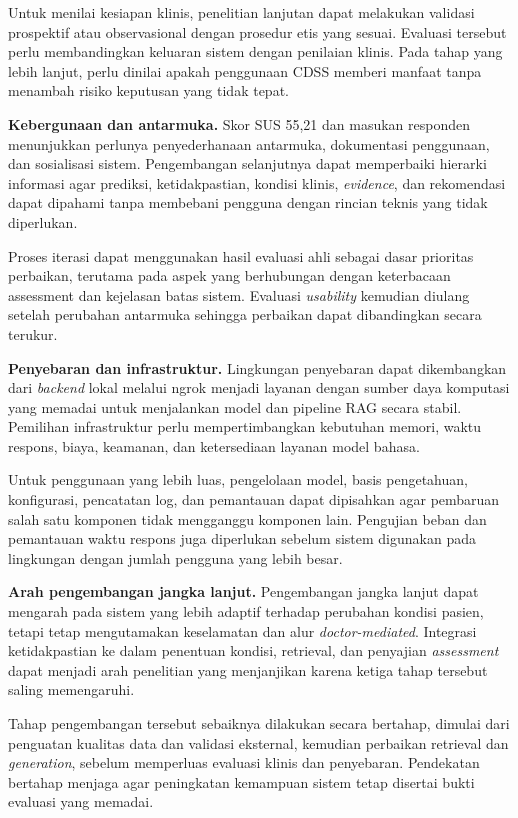Untuk menilai kesiapan klinis, penelitian lanjutan dapat melakukan validasi prospektif atau observasional dengan prosedur etis yang sesuai. Evaluasi
tersebut perlu membandingkan keluaran sistem dengan penilaian klinis. Pada tahap yang lebih lanjut, perlu dinilai apakah penggunaan CDSS memberi manfaat
tanpa menambah risiko keputusan yang tidak tepat.

\textbf{Kebergunaan dan antarmuka.} Skor SUS 55,21 dan masukan responden menunjukkan perlunya penyederhanaan antarmuka, dokumentasi penggunaan, dan sosialisasi sistem. Pengembangan
selanjutnya dapat memperbaiki hierarki informasi agar prediksi, ketidakpastian, kondisi klinis, \textit{evidence}, dan rekomendasi dapat dipahami tanpa
membebani pengguna dengan rincian teknis yang tidak diperlukan.

Proses iterasi dapat menggunakan hasil evaluasi ahli sebagai dasar prioritas perbaikan, terutama pada aspek yang berhubungan dengan keterbacaan
assessment dan kejelasan batas sistem. Evaluasi \textit{usability} kemudian diulang setelah perubahan antarmuka sehingga perbaikan dapat dibandingkan secara
terukur.

\textbf{Penyebaran dan infrastruktur.} Lingkungan penyebaran dapat dikembangkan dari \textit{backend} lokal melalui ngrok menjadi layanan dengan sumber
daya komputasi yang memadai untuk menjalankan model dan pipeline RAG secara stabil. Pemilihan infrastruktur perlu mempertimbangkan kebutuhan memori, waktu respons, biaya, keamanan,
dan ketersediaan layanan model bahasa.

Untuk penggunaan yang lebih luas, pengelolaan model, basis pengetahuan, konfigurasi, pencatatan log, dan pemantauan dapat dipisahkan agar pembaruan salah
satu komponen tidak mengganggu komponen lain. Pengujian beban dan pemantauan waktu respons juga diperlukan sebelum sistem digunakan pada lingkungan dengan
jumlah pengguna yang lebih besar.

\textbf{Arah pengembangan jangka lanjut.} Pengembangan jangka lanjut dapat mengarah pada sistem yang lebih adaptif terhadap perubahan kondisi pasien, tetapi tetap mengutamakan keselamatan
dan alur \textit{doctor-mediated}. Integrasi ketidakpastian ke dalam penentuan kondisi, retrieval, dan penyajian \textit{assessment} dapat menjadi arah
penelitian yang menjanjikan karena ketiga tahap tersebut saling memengaruhi.

Tahap pengembangan tersebut sebaiknya dilakukan secara bertahap, dimulai dari penguatan kualitas data dan validasi eksternal, kemudian perbaikan
retrieval dan \textit{generation}, sebelum memperluas evaluasi klinis dan penyebaran. Pendekatan bertahap menjaga agar peningkatan kemampuan sistem tetap
disertai bukti evaluasi yang memadai.
